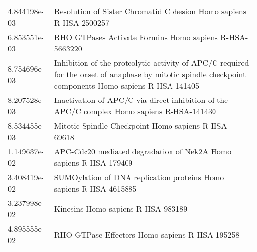 \begin{longtable}{p{2.4cm}p{14.5cm}}
             4.844198e-03 &                                                                                     Resolution of Sister Chromatid Cohesion Homo sapiens R-HSA-2500257 \\
             6.853551e-03 &                                                                                                RHO GTPases Activate Formins Homo sapiens R-HSA-5663220 \\
             8.754696e-03 &  Inhibition of the proteolytic activity of APC/C required for the onset of anaphase by mitotic spindle checkpoint components Homo sapiens R-HSA-141405 \\
             8.207528e-03 &                                                             Inactivation of APC/C via direct inhibition of the APC/C complex Homo sapiens R-HSA-141430 \\
             8.534455e-03 &                                                                                                    Mitotic Spindle Checkpoint Homo sapiens R-HSA-69618 \\
             1.149637e-02 &                                                                                      APC-Cdc20 mediated degradation of Nek2A Homo sapiens R-HSA-179409 \\
             3.408419e-02 &                                                                                     SUMOylation of DNA replication proteins Homo sapiens R-HSA-4615885 \\
             3.237998e-02 &                                                                                                                     Kinesins Homo sapiens R-HSA-983189 \\
             4.895555e-02 &                                                                                                         RHO GTPase Effectors Homo sapiens R-HSA-195258 \\
\end{longtable}


